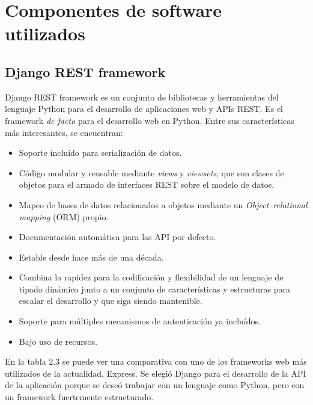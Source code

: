 \section{Componentes de software utilizados}

\subsection{Django REST framework}

Django REST framework es un conjunto de bibliotecas y herramientas del lenguaje Python para el desarrollo de aplicaciones web y APIs REST. Es el framework \textit{de facto} para el desarrollo web en Python. Entre sus características más interesantes, se encuentran\citep{DJANGO:1}:
\begin{itemize}
	\item Soporte incluído para serialización de datos.
	\item Código modular y reusable mediante \textit{views} y \textit{viewsets}, que son clases de objetos para el armado de interfaces REST sobre el modelo de datos.
	\item Mapeo de bases de datos relacionados a objetos mediante un \textit{Object–relational mapping} (ORM) propio.
	\item Documentación automática para las API por defecto.
	\item Estable desde hace más de una década.
	\item Combina la rapidez para la codificación y flexibilidad de un lenguaje de tipado dinámico junto a un conjunto de características y estructuras para escalar el desarrollo y que siga siendo mantenible.
	\item Soporte para múltiples mecanismos de autenticación ya incluídos.
	\item Bajo uso de recursos.
\end{itemize}

En la tabla 2.3 se puede ver una comparativa con uno de los frameworks web más utilizados de la actualidad\citep{EXPRESS:1}, Express. Se elegió Django para el desarrollo de la API de la aplicación porque se deseó trabajar con un lenguaje como Python, pero con un framework fuertemente estructurado.

